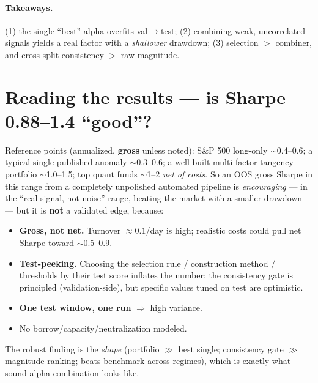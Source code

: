 \documentclass[11pt]{article}
\begin{document}
\paragraph{Takeaways.} (1) the single ``best'' alpha overfits val$\to$test;
(2) combining weak, uncorrelated signals yields a real factor with a \emph{shallower}
drawdown; (3) selection $>$ combiner, and cross-split consistency $>$ raw magnitude.

\section{Reading the results --- is Sharpe 0.88--1.4 ``good''?}

Reference points (annualized, \textbf{gross} unless noted): S\&P 500 long-only
$\sim$0.4--0.6; a typical single published anomaly $\sim$0.3--0.6; a well-built
multi-factor tangency portfolio $\sim$1.0--1.5; top quant funds $\sim$1--2
\emph{net of costs}. So an OOS gross Sharpe in this range from a completely unpolished
automated pipeline is \emph{encouraging} --- in the ``real signal, not noise'' range,
beating the market with a smaller drawdown --- but it is \textbf{not} a validated edge,
because:
\begin{itemize}[leftmargin=*]
  \item \textbf{Gross, not net.} Turnover $\approx 0.1$/day is high; realistic costs
  could pull net Sharpe toward $\sim$0.5--0.9.
  \item \textbf{Test-peeking.} Choosing the selection rule / construction method /
  thresholds by their test score inflates the number; the consistency gate is
  principled (validation-side), but specific values tuned on test are optimistic.
  \item \textbf{One test window, one run} $\Rightarrow$ high variance.
  \item No borrow/capacity/neutralization modeled.
\end{itemize}
The robust finding is the \emph{shape} (portfolio $\gg$ best single; consistency gate
$\gg$ magnitude ranking; beats benchmark across regimes), which is exactly what sound
alpha-combination looks like.
\end{document}
